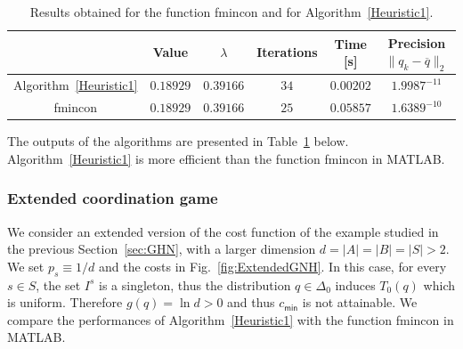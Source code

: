 \documentclass[smallextended,referee,envcountsect,]{svjour3}
\begin{document}
\begin{table}[!h] 
\begin{center}
\caption{Results obtained for {the function fmincon} and for 
Algorithm~\ref{Heuristic1}.}
\label{Table1}
\begin{tabular}{|c|c|c|c|c|c|}
\hline
&Value&$\lambda$&Iterations&Time [s]&Precision $\|q_k-\overline{q}\|_2$ \\
\hline
Algorithm~\ref{Heuristic1} 	& $0.18929$		&  	$0.39166$	&$34$ &	 
$0.00202$ 	& 	$1.9987^{-11}$\\
\hline
fmincon 		&	$0.18929$	&		$0.39166$	&	$25$ & $0.05857$		&  
$1.6389^{-10} $\\
\hline
\end{tabular}
%
\end{center}
\end{table}

The outputs of the algorithms are presented in Table~\ref{Table1} 
below. Algorithm~\ref{Heuristic1} is more efficient than {the 
function fmincon} in MATLAB.



\subsubsection{Extended coordination game}%

We consider an extended version of the cost function of the 
example studied in the previous 
Section~\ref{sec:GHN}, with a larger dimension $d = |A| = |B| = |S| 
>2$. We set $p_s\equiv 1/d$ and the costs in 
Fig.~\ref{fig:ExtendedGNH}. In this case, for every
$s\in S$, the set $I^{s}$ is a singleton, {thus the distribution $q\in 
\Delta_0$ induces $T_0(q) $ which is 
uniform. Therefore $g(q)  = \ln d>0$ and thus $c_{\textsf{min}}$ is not attainable.} We compare the performances of Algorithm~\ref{Heuristic1} with 
{the function fmincon} in MATLAB.
\end{document}
